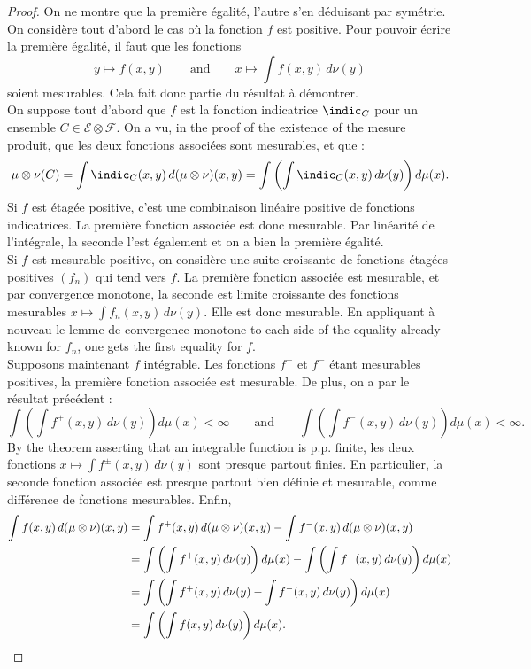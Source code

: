 \begin{proof}
  On ne montre que la première égalité, l'autre s'en déduisant par symétrie. On
  considère tout d'abord le cas où la fonction $f$ est positive. Pour pouvoir écrire
  la première égalité, il faut que les fonctions
  \[
    y \mapsto f(x,y)
    \qquad \text{and} \qquad
    x \mapsto \int f(x,y) \, d\nu(y)
  \]
  soient mesurables. Cela fait donc partie du résultat à démontrer.\\

  On suppose tout d'abord que $f$ est la fonction indicatrice $\indic_{C}$ pour un
  ensemble $C \in \mathcal{E} \otimes \mathcal{F}$. On a vu, in the proof of the
  existence of the mesure produit, que les deux fonctions associées sont mesurables,
  et que :
  \[
    \mu \otimes \nu(C) = \int \indic_{C}(x,y) \, d(\mu \otimes \nu)(x,y)
    = \int \left( \int \indic_{C}(x,y) \, d\nu(y) \right) d\mu(x) .
  \]
  Si $f$ est étagée positive, c'est une combinaison linéaire positive de fonctions
  indicatrices. La première fonction associée est donc mesurable. Par linéarité de
  l'intégrale, la seconde l'est également et on a bien la première égalité.\\

  Si $f$ est mesurable positive, on considère une suite croissante de fonctions
  étagées positives $(f_{n})$ qui tend vers $f$. La première fonction associée est
  mesurable, et par convergence monotone, la seconde est limite croissante des
  fonctions mesurables $x \mapsto \int f_{n}(x,y) \, d\nu(y)$. Elle est donc
  mesurable. En appliquant à nouveau le lemme de convergence monotone to each side of
  the equality already known for $f_{n}$, one gets the first equality for $f$.\\

  Supposons maintenant $f$ intégrable. Les fonctions $f^{+}$ et $f^{-}$ étant
  mesurables positives, la première fonction associée est mesurable. De plus, on a
  par le résultat précédent :
  \[
    \int \left( \int f^{+}(x,y) \, d\nu(y) \right) d\mu(x) < \infty
    \qquad \text{and} \qquad
    \int \left( \int f^{-}(x,y) \, d\nu(y) \right) d\mu(x) < \infty .
  \]
  By the theorem asserting that an integrable function is p.p. finite, les deux
  fonctions $x \mapsto \int f^{\pm}(x,y) \, d\nu(y)$ sont presque partout finies. En
  particulier, la seconde fonction associée est presque partout bien définie et
  mesurable, comme différence de fonctions mesurables. Enfin,
  \begin{align*}
    \int f(x,y) \, d(\mu \otimes \nu)(x,y)
      &= \int f^{+}(x,y) \, d(\mu \otimes \nu)(x,y)
       - \int f^{-}(x,y) \, d(\mu \otimes \nu)(x,y) \\
      &= \int \left( \int f^{+}(x,y) \, d\nu(y) \right) d\mu(x)
       - \int \left( \int f^{-}(x,y) \, d\nu(y) \right) d\mu(x) \\
      &= \int \left( \int f^{+}(x,y) \, d\nu(y)
         - \int f^{-}(x,y) \, d\nu(y) \right) d\mu(x) \\
      &= \int \left( \int f(x,y) \, d\nu(y) \right) d\mu(x) . \qedhere
  \end{align*}
\end{proof}

